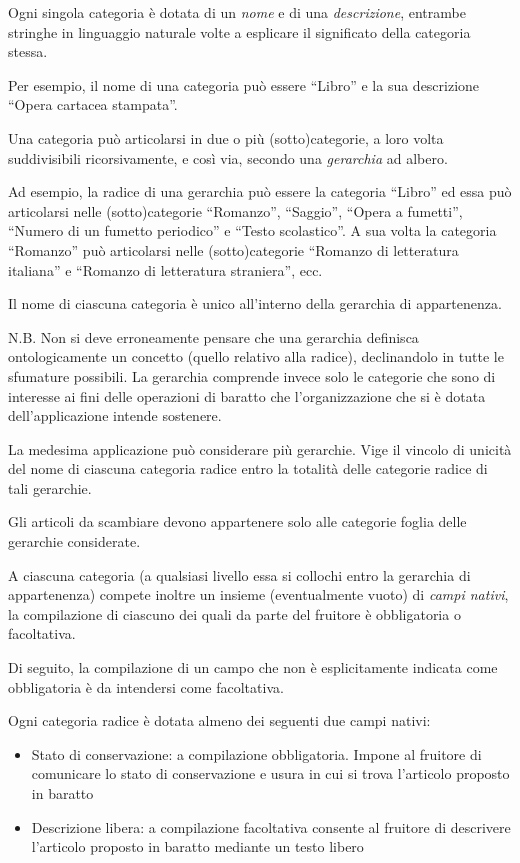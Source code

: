 Ogni singola categoria è dotata di un \textit{nome} e di una \textit{descrizione}, entrambe stringhe in linguaggio naturale volte a esplicare il significato della categoria stessa.

Per esempio, il nome di una categoria può essere “Libro” e la sua descrizione “Opera cartacea stampata”.

Una categoria può articolarsi in due o più (sotto)categorie, a loro volta suddivisibili ricorsivamente, e così via, secondo una \textit{gerarchia} ad albero.

Ad esempio, la radice di una gerarchia può essere la categoria “Libro” ed essa può articolarsi nelle (sotto)categorie “Romanzo”, “Saggio”, “Opera a fumetti”, “Numero di un fumetto periodico” e “Testo scolastico”. A sua volta la categoria “Romanzo” può articolarsi nelle (sotto)categorie “Romanzo di letteratura italiana” e “Romanzo di letteratura straniera”, ecc.

Il nome di ciascuna categoria è unico all’interno della gerarchia di appartenenza.\newline

N.B. Non si deve erroneamente pensare che una gerarchia definisca ontologicamente un concetto (quello relativo alla radice), declinandolo in tutte le sfumature possibili. La gerarchia comprende invece solo le categorie che sono di interesse ai fini delle operazioni di baratto che l’organizzazione che si è dotata dell’applicazione intende sostenere.\newline

La medesima applicazione può considerare più gerarchie. Vige il vincolo di unicità del nome di ciascuna categoria radice entro la totalità delle categorie radice di tali gerarchie.

Gli articoli da scambiare devono appartenere solo alle categorie foglia delle gerarchie considerate.

A ciascuna categoria (a qualsiasi livello essa si collochi entro la gerarchia di appartenenza) compete inoltre un insieme (eventualmente vuoto) di \textit{campi nativi}, la compilazione di ciascuno dei quali da parte del fruitore è obbligatoria o facoltativa.

Di seguito, la compilazione di un campo che non è esplicitamente indicata come obbligatoria è da intendersi come facoltativa.

Ogni categoria radice è dotata almeno dei seguenti due campi nativi:
\begin{itemize}
  \item Stato di conservazione: a compilazione obbligatoria. Impone al fruitore di comunicare lo stato di conservazione e usura in cui si trova l’articolo proposto in baratto
  \item Descrizione libera: a compilazione facoltativa consente al fruitore di descrivere l’articolo proposto in baratto mediante un testo libero
\end{itemize}

